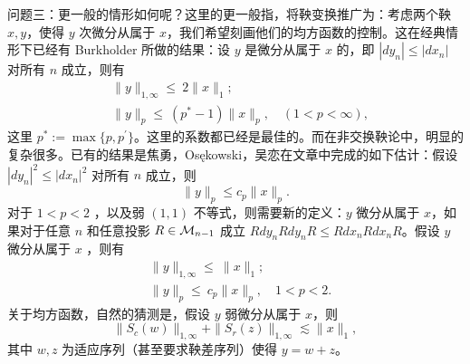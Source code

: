 问题三：更一般的情形如何呢？这里的更一般指，将鞅变换推广为：考虑两个鞅 $x,y$，使得 $y$ 次微分从属于 $x$，我们希望刻画他们的均方函数的控制。这在经典情形下已经有 Burkholder 所做的结果：设 $y$ 是微分从属于 $x$ 的，即 $|dy_n|\leq|dx_n|$ 对所有 $n$ 成立，则有
\begin{align*}
    &\|y\|_{1,\infty}\leq \ 2\|x\|_1;\\
    &\|y\|_p\leq \ (p^\ast-1)\|x\|_p,\quad (1<p<\infty),
\end{align*}
这里 $p^\ast:=\max\{p,p^\prime\}$。这里的系数都已经是最佳的。而在非交换鞅论中，明显的复杂很多。已有的结果是焦勇，Osękowski，吴恋在文章\cite{JIAO2018216}中完成的如下估计：假设 $|dy_n|^2\leq |dx_n|^2$ 对所有 $n$ 成立，则
\[ \|y\|_p\leq c_p\|x\|_p. \]
对于 $1<p<2$ ，以及弱 $(1,1)$ 不等式，则需要新的定义：$y$ 微分从属于 $x$，如果对于任意 $n$ 和任意投影 $R\in\mathcal{M}_{n-1}$ 成立 $Rdy_nRdy_nR\leq Rdx_nRdx_nR$。假设 $y$ 微分从属于 $x$ ，则有
\begin{align*}
    &\|y\|_{1,\infty}\leq\ \|x\|_1;\\
    &\|y\|_{p}\leq\ c_p\|x\|_p,\quad 1<p<2.
\end{align*}
关于均方函数，自然的猜测是，假设 $y$ 弱微分从属于 $x$，则
\[ \|S_c(w)\|_{1,\infty}+\|S_r(z)\|_{1,\infty}\lesssim\|x\|_1, \]
其中 $w,z$ 为适应序列（甚至要求鞅差序列）使得 $y=w+z$。






